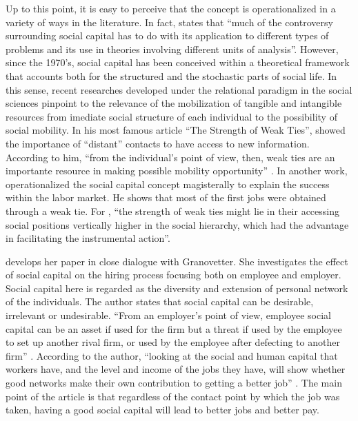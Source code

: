 \documentclass[a4paper, 12pt, openright, oneside, article, german, french, brazil, english]{abntex2}
\begin{document}
Up to this point, it is easy to perceive that the concept is operationalized in a variety of ways in the literature. In fact,  states that ``much of the controversy surrounding social capital has to do with its application to different types of problems and its use in theories involving different units of analysis''. However, since the 1970's, social capital has been conceived within a theoretical framework that accounts both for the structured and the stochastic parts of social life. In this sense, recent researches developed under the relational paradigm in the social sciences pinpoint to the relevance of the mobilization of tangible and intangible resources from imediate social structure of each individual to the possibility of social mobility. In his most famous article ``The Strength of Weak Ties'',  showed the importance of ``distant'' contacts to have access to new information. According to him, ``from  the  individual's  point  of  view,  then,  weak  ties  are  an  importante resource in making possible mobility opportunity'' \cite[p. 1373]{granovetter1973strength}.  In another work,  operationalized the social capital concept magisterally to explain the success within the labor market. He shows that most of the first jobs were obtained through a weak tie. For , ``the strength of weak ties might lie in their accessing social positions vertically higher in the social hierarchy, which had the advantage in facilitating the instrumental action''.

 develops her paper in close dialogue with Granovetter. She investigates the effect of social capital on the hiring process focusing both on employee and employer. Social capital here is regarded as the diversity and extension of personal network of the individuals. The author states that social capital can be desirable, irrelevant or undesirable. ``From an employer's point of view, employee social capital can be an asset if used for the  firm but a threat if used by the employee to set up another rival firm, or used by the employee after defecting to another firm'' \cite[p. 131-2]{erickson2001good}. According to the author, ``looking  at  the  social  and  human  capital  that  workers have,  and  the  level  and income  of  the  jobs  they  have,  will show whether good networks make their own contribution to getting a better job'' \cite[p. 133]{erickson2001good}. The main point of the article is that regardless of the contact point by which the job was taken, having a good social capital will lead to better jobs and better pay.
\end{document}
